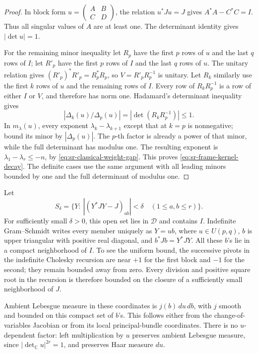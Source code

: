 \begin{proof}
In block form \(u=\left(\begin{smallmatrix}A&B\\ C&D\end{smallmatrix}\right)\),
the relation \(u^*Ju=J\) gives \(A^*A-C^*C=I\).
Thus all singular values of \(A\) are at least one.
The determinant identity gives \(|\det u|=1\).

For the remaining minor inequality let \(R_p\) have the first
\(p\) rows of \(u\) and the last \(q\) rows of \(I\);
let \(R'_p\) have the first \(p\) rows of \(I\) and the last
\(q\) rows of \(u\).
The unitary relation gives
\((R'_p)^*R'_p=R_p^*R_p\), so \(V=R'_pR_p^{-1}\) is unitary.
Let \(R_k\) similarly use the first \(k\) rows of \(u\) and
the remaining rows of \(I\).
Every row of \(R_kR_p^{-1}\) is a row of either \(I\) or \(V\),
and therefore has norm one.
Hadamard's determinant inequality gives
\[
 |\Delta_k(u)/\Delta_p(u)|
       =|\det(R_kR_p^{-1})|\le1.
\]
In \(m_\lambda(u)\), every exponent
\(\lambda_k-\lambda_{k+1}\) except that at \(k=p\)
is nonnegative; bound its minor by \(|\Delta_p(u)|\).
The \(p\)-th factor is already a power of that minor, while
the full determinant has modulus one.
The resulting exponent is
\(\lambda_1-\lambda_r\le-n\), by
\eqref{eq:sr-classical-weight-gap}.
This proves \eqref{eq:sr-frame-kernel-decay}.
The definite cases use the same argument with all leading minors
bounded by one and the full determinant of modulus one.
\end{proof}

Let
\[
 S_\delta=\{Y:\ |(Y^*JY-J)_{ab}|<\delta\quad(1\le a,b\le r)\}.
\]
For sufficiently small \(\delta>0\), this open set lies in
\(\mathcal D\) and contains \(I\).
Indefinite Gram--Schmidt writes every member uniquely as
\(Y=ub\), where \(u\in U(p,q)\), \(b\) is upper triangular
with positive real diagonal, and \(b^*Jb=Y^*JY\).
All these \(b\)'s lie in a compact neighborhood of \(I\).
To see the uniform bound, the successive pivots in the
indefinite Cholesky recursion are near \(+1\) for the first block
and \(-1\) for the second; they remain bounded away from zero.
Every division and positive square root in the recursion is
therefore bounded on the closure of a sufficiently small
neighborhood of \(J\).

Ambient Lebesgue measure in these coordinates is
\(j(b)\,du\,db\), with \(j\) smooth and bounded on this compact
set of \(b\)'s.  This follows either from the change-of-variables
Jacobian or from its local principal-bundle coordinates.
There is no \(u\)-dependent factor: left multiplication by
\(u\) preserves ambient Lebesgue measure, since
\(|\det_\mathbb C u|^{2r}=1\), and preserves Haar measure \(du\).

